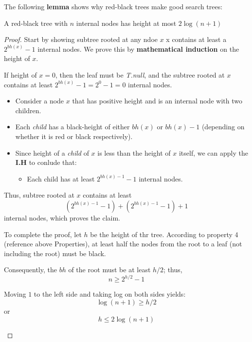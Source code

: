 \documentclass[10pt, 
a4paper, 
oneside, 
headinclude, footinclude, 
BCOR5mm]
{scrartcl}
\begin{document}
The following \textbf{lemma} shows why red-black trees make good search trees:
\begin{lemma}
    A red-black tree with $n$ internal nodes has height at most $2\log (n+1)$
\end{lemma}
\begin{proof}
    Start by showing subtree rooted at any ndoe $x$ x contains at least a $2^{bh(x)}-1$ internal nodes. We prove this by \textbf{mathematical induction} on the height of $x$.
    \begin{description}
        \item [\textbf{Claim:}] If height of $x=0$, then the leaf must be \textit{T.null}, and the subtree rooted at $x$ contains at least $2^{bh(x)}-1=2^0-1=0$ internal nodes.
        \begin{description}
            \item [\textbf{Inductive step:}] 
            \begin{itemize}
                \item Consider a node $x$ that has positive height and is an internal node with two children.
                \item Each \textit{child} has a black-height of either $bh(x)$ or $bh(x)-1$ (depending on whether it is {\color{red}red} or black respectively).
                \item Since height of a \textit{child} of $x$ is less than the height of $x$ itself, we can apply the \textbf{I.H} to conlude that:
                \begin{itemize}
                    \item Each child has at least $2^{bh(x)-1}-1$ internal nodes.
                \end{itemize}
            \end{itemize}
            \item Thus, subtree rooted at $x$ contains at least $$(2^{bh(x)-1}-1)+(2^{bh(x)-1}-1)+1$$ internal nodes, which proves the claim.
        \end{description} 
        \item To complete the proof, let $h$ be the height of thr tree. According to property 4 (reference above Properties), at least half the nodes from the root 
        to a leaf (not including the root) must be black.
        \item Consequently, the $bh$ of the root must be at least $h/2$; thus, $$n \geq 2^{h/2}-1$$
        \item Moving $1$ to the left side and taking log on both sides yields: $$\log(n+1) \geq h/2$$ or $$h \leq 2\log(n+1)$$
    \end{description}
\end{proof}
\end{document}
